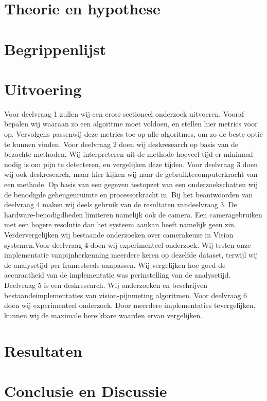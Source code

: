 \documentclass[11pt]{article}
\begin{document}
    \section{Theorie en hypothese}


    \section{Begrippenlijst}


    \section{Uitvoering}
    Voor deelvraag 1 zullen wij een cross-sectioneel onderzoek uitvoeren.
    Vooraf bepalen wij waaraan zo een algoritme moet voldoen, en stellen hier metrics voor op.
    Vervolgens passenwij deze metrics toe op alle algoritmes, om zo de beste optie te kunnen vinden.
    Voor deelvraag 2 doen wij deskresearch op basis van de bezochte methoden.
    Wij interpreteren uit de methode hoeveel tijd er minimaal nodig is om pijn te detecteren, en vergelijken deze tijden.
    Voor deelvraag 3 doen wij ook deskresearch, maar hier kijken wij naar de gebruiktecomputerkracht van een methode.
    Op basis van een gegeven testopzet van een onderzoekschatten wij de benodigde geheugenruimte en processorkracht in.
    Bij het beantwoorden van deelvraag 4 maken wij deels gebruik van de resultaten vandeelvraag 3.
    De hardware-benodigdheden limiteren namelijk ook de camera.
    Een cameragebruiken met een hogere resolutie dan het systeem aankan heeft namelijk geen zin.
    Verdervergelijken wij bestaande onderzoeken over camerakeuze in Vision systemen.Voor deelvraag 4 doen wij experimenteel onderzoek.
    Wij testen onze implementatie vanpijnherkenning meerdere keren op dezelfde dataset, terwijl wij de analysetijd per framesteeds aanpassen.
    Wij vergelijken hoe goed de accuraatheid van de implementatie was perinstelling van de analysetijd.
    Deelvraag 5 is een deskresearch.
    Wij onderzoeken en beschrijven bestaandeimplementaties van vision-pijnmeting algoritmen.
    Voor deelvraag 6 doen wij experimenteel onderzoek.
    Door meerdere implementaties tevergelijken, kunnen wij de maximale bereikbare waarden ervan vergelijken.


    \section{Resultaten}


    \section{Conclusie en Discussie}
\end{document}
